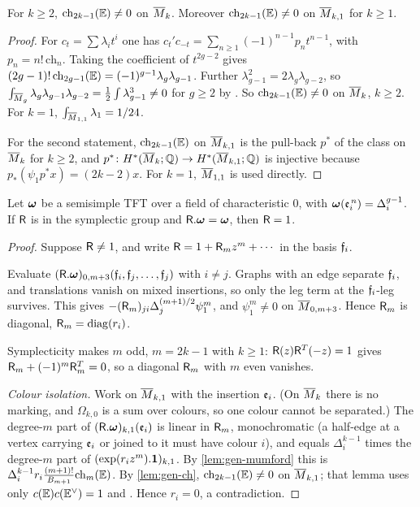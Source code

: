\begin{lem}
\label{lem:gen-ch}
For $k\geq2$, $\mathrm{ch}_{2k-1}(\mathbb{E})\neq0$ on $\overline{M}_k$. Moreover $\mathrm{ch}_{2k-1}(\mathbb{E})\neq0$ on $\overline{M}_{k,1}$ for $k\geq1$.
\end{lem}
\begin{proof}
For $c_t=\sum\lambda_it^i$ one has $c_t'c_{-t}=\sum_{n\geq1}(-1)^{n-1}p_nt^{n-1}$, with $p_n=n!\,\mathrm{ch}_n$. Taking the coefficient of $t^{2g-2}$ gives $(2g-1)!\,\mathrm{ch}_{2g-1}(\mathbb{E})=(-1)^{g-1}\lambda_g\lambda_{g-1}$. Further $\lambda_{g-1}^2=2\lambda_g\lambda_{g-2}$, so $\int_{\overline{M}_g}\lambda_g\lambda_{g-1}\lambda_{g-2}=\frac12\int\lambda_{g-1}^3\neq0$ for $g\geq2$ by \cite[Theorem 4]{FP00}. So $\mathrm{ch}_{2k-1}(\mathbb{E})\neq0$ on $\overline{M}_k$, $k\geq2$. For $k=1$, $\int_{\overline{M}_{1,1}}\lambda_1=1/24$.

For the second statement, $\mathrm{ch}_{2k-1}(\mathbb{E})$ on $\overline{M}_{k,1}$ is the pull-back $p^*$ of the class on $\overline{M}_k$ for $k\geq2$, and $p^*\colon H^*(\overline{M}_k;\mathbb{Q})\to H^*(\overline{M}_{k,1};\mathbb{Q})$ is injective because $p_*(\psi_1p^*x)=(2k-2)x$. For $k=1$, $\overline{M}_{1,1}$ is used directly.
\end{proof}

\begin{lem}
\label{lem:gen-free}
Let $\boldsymbol{\omega}$ be a semisimple TFT over a field of characteristic $0$, with $\boldsymbol{\omega}(\mathfrak{e}_i^{\,n})=\Delta_i^{g-1}$. If $\mathsf{R}$ is in the symplectic group and $\mathsf{R}.\boldsymbol{\omega}=\boldsymbol{\omega}$, then $\mathsf{R}=1$.
\end{lem}
\begin{proof}
Suppose $\mathsf{R}\neq1$, and write $\mathsf{R}=1+\mathsf{R}_mz^m+\cdots$ in the basis $\mathfrak{f}_i$.

Evaluate $(\mathsf{R}.\boldsymbol{\omega})_{0,m+3}(\mathfrak{f}_i,\mathfrak{f}_j,\dots,\mathfrak{f}_j)$ with $i\neq j$. Graphs with an edge separate $\mathfrak{f}_i$, and translations vanish on mixed insertions, so only the leg term at the $\mathfrak{f}_i$-leg survives. This gives $-(\mathsf{R}_m)_{ji}\Delta_j^{(m+1)/2}\psi_1^m$, and $\psi_1^m\neq0$ on $\overline{M}_{0,m+3}$. Hence $\mathsf{R}_m$ is diagonal, $\mathsf{R}_m=\mathrm{diag}(r_i)$.

Symplecticity makes $m$ odd, $m=2k-1$ with $k\geq1$: $\mathsf{R}(z)\mathsf{R}^T(-z)=1$ gives $\mathsf{R}_m+(-1)^m\mathsf{R}_m^T=0$, so a diagonal $\mathsf{R}_m$ with $m$ even vanishes.

\emph{Colour isolation.} Work on $\overline{M}_{k,1}$ with the insertion $\mathfrak{e}_i$. (On $\overline{M}_k$ there is no marking, and $\Omega_{k,0}$ is a sum over colours, so one colour cannot be separated.) The degree-$m$ part of $(\mathsf{R}.\boldsymbol{\omega})_{k,1}(\mathfrak{e}_i)$ is linear in $\mathsf{R}_m$, monochromatic (a half-edge at a vertex carrying $\mathfrak{e}_i$ or joined to it must have colour $i$), and equals $\Delta_i^{k-1}$ times the degree-$m$ part of $(\exp(r_iz^m).\mathbf{1})_{k,1}$. By \cref{lem:gen-mumford} this is $\Delta_i^{k-1}r_i\frac{(m+1)!}{B_{m+1}}\mathrm{ch}_m(\mathbb{E})$. By \cref{lem:gen-ch}, $\mathrm{ch}_{2k-1}(\mathbb{E})\neq0$ on $\overline{M}_{k,1}$; that lemma uses only $c(\mathbb{E})c(\mathbb{E}^\vee)=1$ and \cite[Theorem 4]{FP00}. Hence $r_i=0$, a contradiction.
\end{proof}

